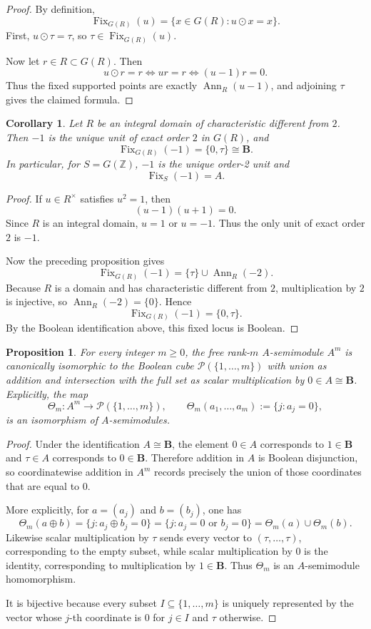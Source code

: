 \documentclass[11pt,a4paper]{article}
\newtheorem{proposition}[theorem]{Proposition}
\newtheorem{corollary}[theorem]{Corollary}
\theoremstyle{definition}
\theoremstyle{remark}
\DeclareMathOperator{\Fix}{Fix}
\DeclareMathOperator{\Ann}{Ann}
\newcommand{\ZZ}{\mathbb Z}
\newcommand{\BB}{\mathbf B}
\newcommand{\cP}{\mathcal P}
\begin{document}
\begin{proof}
By definition,
\[
\Fix_{G(R)}(u)=\{x\in G(R):u\odot x=x\}.
\]
First, \(u\odot\tau=\tau\), so \(\tau\in\Fix_{G(R)}(u)\).

Now let \(r\in R\subset G(R)\). Then
\[
u\odot r=r\iff ur=r\iff (u-1)r=0.
\]
Thus the fixed supported points are exactly \(\Ann_R(u-1)\), and adjoining \(\tau\) gives the claimed formula.
\end{proof}

\begin{corollary}
Let \(R\) be an integral domain of characteristic different from \(2\). Then \(-1\) is the unique unit of exact order \(2\) in \(G(R)\), and
\[
\Fix_{G(R)}(-1)=\{0,\tau\}\cong \BB.
\]
In particular, for \(S=G(\ZZ)\), \(-1\) is the unique order-2 unit and
\[
\Fix_S(-1)=A.
\]
\end{corollary}

\begin{proof}
If \(u\in R^\times\) satisfies \(u^2=1\), then
\[
(u-1)(u+1)=0.
\]
Since \(R\) is an integral domain, \(u=1\) or \(u=-1\). Thus the only unit of exact order \(2\) is \(-1\).

Now the preceding proposition gives
\[
\Fix_{G(R)}(-1)=\{\tau\}\cup\Ann_R(-2).
\]
Because \(R\) is a domain and has characteristic different from \(2\), multiplication by \(2\) is injective, so \(\Ann_R(-2)=\{0\}\). Hence
\[
\Fix_{G(R)}(-1)=\{0,\tau\}.
\]
By the Boolean identification above, this fixed locus is Boolean.
\end{proof}

\begin{proposition}
For every integer \(m\ge0\), the free rank-\(m\) \(A\)-semimodule \(A^m\) is canonically isomorphic to the Boolean cube \(\cP(\{1,\dots,m\})\) with union as addition and intersection with the full set as scalar multiplication by \(0\in A\cong\BB\).
Explicitly, the map
\[
\Theta_m:A^m\longrightarrow \cP(\{1,\dots,m\}),
\qquad
\Theta_m(a_1,\dots,a_m):=\{j:a_j=0\},
\]
is an isomorphism of \(A\)-semimodules.
\end{proposition}

\begin{proof}
Under the identification \(A\cong\BB\), the element \(0\in A\) corresponds to \(1\in\BB\) and \(\tau\in A\) corresponds to \(0\in\BB\). Therefore addition in \(A\) is Boolean disjunction, so coordinatewise addition in \(A^m\) records precisely the union of those coordinates that are equal to \(0\).

More explicitly, for \(a=(a_j)\) and \(b=(b_j)\), one has
\[
\Theta_m(a\oplus b)
=\{j:a_j\oplus b_j=0\}
=\{j:a_j=0\text{ or }b_j=0\}
=\Theta_m(a)\cup\Theta_m(b).
\]
Likewise scalar multiplication by \(\tau\) sends every vector to \((\tau,\dots,\tau)\), corresponding to the empty subset, while scalar multiplication by \(0\) is the identity, corresponding to multiplication by \(1\in\BB\). Thus \(\Theta_m\) is an \(A\)-semimodule homomorphism.

It is bijective because every subset \(I\subseteq\{1,
\dots,m\}\) is uniquely represented by the vector whose \(j\)-th coordinate is \(0\) for \(j\in I\) and \(\tau\) otherwise.
\end{proof}
\end{document}
